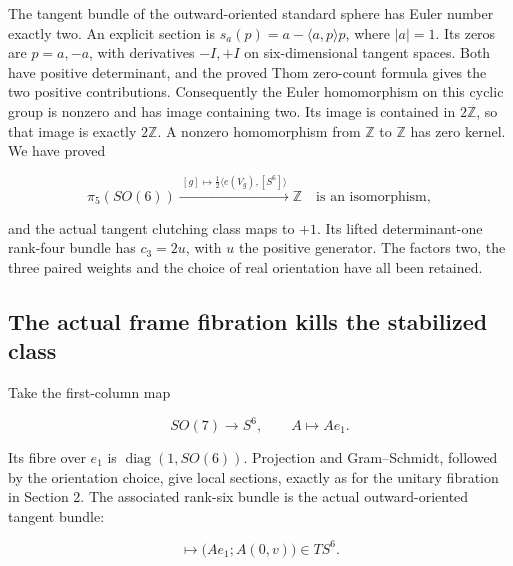 The tangent bundle of the outward-oriented standard sphere has Euler number exactly two. An explicit section is \(s_a(p)=a-\langle a,p\rangle p\), where \(|a|=1\). Its zeros are \(p=a,-a\), with derivatives \(-I,+I\) on six-dimensional tangent spaces. Both have positive determinant, and the proved Thom zero-count formula gives the two positive contributions. Consequently the Euler homomorphism on this cyclic group is nonzero and has image containing two. Its image is contained in \(2\mathbb Z\), so that image is exactly \(2\mathbb Z\). A nonzero homomorphism from \(\mathbb Z\) to \(\mathbb Z\) has zero kernel. We have proved

\begin{equation}
\pi_5(SO(6))\xrightarrow{\ [g]\mapsto
\frac12\langle e(V_g),[S^6]\rangle\ }\mathbb Z
\quad\text{is an isomorphism},
\label{courseIII:spin-six-and-the-framing-comparison:eq:4.7}
\end{equation}

and the actual tangent clutching class maps to \(+1\). Its lifted determinant-one rank-four bundle has \(c_3=2u\), with \(u\) the positive generator. The factors two, the three paired weights and the choice of real orientation have all been retained.

\subsection{The actual frame fibration kills the stabilized class}
\label{courseIII:spin-six-and-the-framing-comparison:framing-so7}

\label{courseIII:spin-six-and-the-framing-comparison:section-5}\label{courseIII:spin6:5}

Take the first-column map

\begin{equation}
SO(7)\longrightarrow S^6,
\qquad A\longmapsto Ae_1.
\label{courseIII:spin-six-and-the-framing-comparison:eq:5.1}
\end{equation}

Its fibre over \(e_1\) is \(\operatorname{diag}(1,SO(6))\). Projection and Gram--Schmidt, followed by the orientation choice, give local sections, exactly as for the unitary fibration in Section 2. The associated rank-six bundle is the actual outward-oriented tangent bundle:

\begin{equation}
[A,v]\longmapsto
\bigl(Ae_1;A(0,v)\bigr)\in TS^6.
\label{courseIII:spin-six-and-the-framing-comparison:eq:5.2}
\end{equation}

